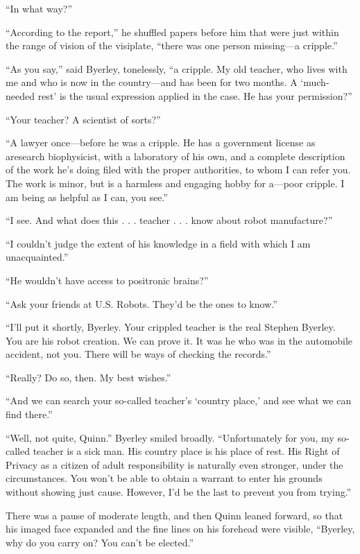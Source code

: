 \documentclass[10pt,a5paper,twoside]{book}
\begin{document}
“In what way?”

“According to the report,” he shuffled papers before him that were just within the range of vision of the visiplate, “there was one person missing—a cripple.”

“As you say,” said Byerley, tonelessly, “a cripple. My old teacher, who lives with me and who is now in the country—and has been for two months. A ‘much- needed rest’ is the usual expression applied in the case. He has your permission?”

“Your teacher? A scientist of sorts?”

“A lawyer once—before he was a cripple. He has a government license as aresearch biophysicist, with a laboratory of his own, and a complete description of the work he’s doing filed with the proper authorities, to whom I can refer you. The work is minor, but is a harmless and engaging hobby for a—poor cripple. I am being as helpful as I can, you see.”

“I see. And what does this . . . teacher . . . know about robot manufacture?”

“I couldn’t judge the extent of his knowledge in a field with which I am unacquainted.”

“He wouldn’t have access to positronic brains?”

“Ask your friends at U.S. Robots. They’d be the ones to know.”

“I’ll put it shortly, Byerley. Your crippled teacher is the real Stephen Byerley. You are his robot creation. We can prove it. It was he who was in the automobile accident, not you. There will be ways of checking the records.”

“Really? Do so, then. My best wishes.”

“And we can search your so-called teacher’s ‘country place,’ and see what we can find there.”

“Well, not quite, Quinn.” Byerley smiled broadly. “Unfortunately for you, my so-called teacher is a sick man. His country place is his place of rest. His Right of Privacy as a citizen of adult responsibility is naturally even stronger, under the circumstances. You won’t be able to obtain a warrant to enter his grounds without showing just cause. However, I’d be the last to prevent you from trying.”

There was a pause of moderate length, and then Quinn leaned forward, so that his imaged face expanded and the fine lines on his forehead were visible, “Byerley, why do you carry on? You can’t be elected.”
\end{document}
